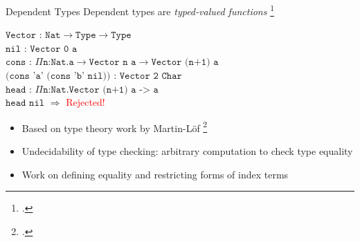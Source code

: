 \documentclass[aspectratio=169]{beamer}
\begin{document}
\begin{frame}{Dependent Types}
    Dependent types are \emph{typed-valued functions} \footcite{pierce_advanced_2005}
\pause
\begin{center}
   $\texttt{Vector : Nat}\rightarrow\texttt{Type}\rightarrow\texttt{Type}$
   \pause
   \\
   $\texttt{nil : Vector 0 a}$
   \\
   \pause
   $\texttt{cons : }\Pi\texttt{n:Nat.a}\rightarrow\texttt{Vector n a}\rightarrow\texttt{Vector (n+1) a}$
   \\
   \pause
   $\texttt{(cons 'a' (cons 'b' nil)) : Vector 2 Char}$
   \\
   \pause
   $\texttt{head : }\Pi\texttt{n:Nat.Vector (n+1) a -> a}$
   \\
   \pause
   $\texttt{head nil}$ \pause $\Rightarrow$ \textcolor{red}{Rejected!}
\end{center}
    \pause
    \begin{itemize}
        \item Based on type theory work by Martin-L{\"o}f \footcite{martin-lof_constructive_1984}
        \item \alert{Undecidability} of type checking: arbitrary computation to check type equality
        \item Work on defining equality and restricting forms of index terms
    \end{itemize}
    \vspace{0.1in}
\end{frame}
\end{document}
